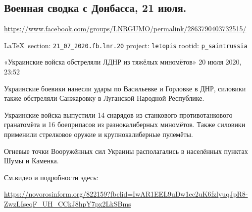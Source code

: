  
 
  
\subsection{Военная сводка с Донбасса, 21 июля.}
\label{sec:21_07_2020.fb.lnr.20}
\url{https://www.facebook.com/groups/LNRGUMO/permalink/2863790403732515/}

\vspace{0.5cm}
{\small\LaTeX~section: \verb|21_07_2020.fb.lnr.20| project: \verb|letopis| rootid: \verb|p_saintrussia|}
\vspace{0.5cm}

«Украинские войска обстреляли ЛДНР из тяжёлых миномётов» 20 июля 2020, 23:52

Украинские боевики нанесли удары по Васильевке и Горловке в ДНР, силовики также
обстреляли Санжаровку в Луганской Народной Республике.

Украинские войска выпустили 14 снарядов из станкового противотанкового
гранатомёта и 16 боеприпасов из разнокалиберных миномётов.  Также силовики
применили стрелковое оружие и крупнокалиберные пулемёты.

Огневые точки Вооружённых сил Украины располагались в населённых пунктах Шумы и
Каменка.

См.видео и подробности здесь:

\url{https://novorosinform.org/822159?fbclid=IwAR1EEL9uDw1ec2uK6fzlyuqJpR8-ZwzLIseqF_UH_CCkJ8hpY7px2LkSBms}
  
